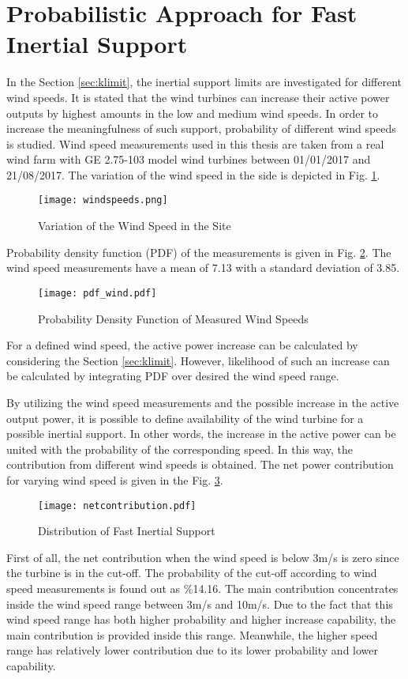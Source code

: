\section{Probabilistic Approach for Fast Inertial Support}
In the Section \ref{sec:klimit}, the inertial support limits are investigated for different wind speeds. It is stated that the wind turbines can increase their active power outputs by highest amounts in the low and medium wind speeds. In order to increase the meaningfulness of such support, probability of different wind speeds is studied. Wind speed measurements used in this thesis are taken from a real wind farm with GE 2.75-103 model wind turbines between 01/01/2017 and 21/08/2017. The variation of the wind speed in the side is depicted in Fig. \ref{windvariation}.\par
\begin{figure}[h!]
	\centering
	\texttt{[image: windspeeds.png]}
	\caption{Variation of the Wind Speed in the Site}
	\label{windvariation}
\end{figure}
Probability density function (PDF) of the measurements is given in Fig. \ref{windpdf}. The wind speed measurements have a mean of 7.13 with a standard deviation of 3.85.\par
\begin{figure}[h!]
	\centering
	\texttt{[image: pdf\_wind.pdf]}
	\caption{Probability Density Function of Measured Wind Speeds}
	\label{windpdf}
\end{figure}
For a defined wind speed, the active power increase can be calculated by considering the Section \ref{sec:klimit}. However, likelihood of such an increase can be calculated by integrating PDF over desired the wind speed range.\par
By utilizing the wind speed measurements and the possible increase in the active output power, it is possible to define availability of the wind turbine for a possible inertial support. In other words, the increase in the active power can be united with the probability of the corresponding speed. In this way, the contribution from different wind speeds is obtained. The net power contribution for varying wind speed is given in the Fig. \ref{net_contribution}.\par
\begin{figure}[h!]
	\centering
	\texttt{[image: netcontribution.pdf]}
	\caption{Distribution of Fast Inertial Support}
	\label{net_contribution}
\end{figure}
First of all, the net contribution when the wind speed is below 3m/s is zero since the turbine is in the cut-off. The probability of the cut-off according to wind speed measurements is found out as \%14.16. The main contribution concentrates inside the wind speed range between 3m/s and 10m/s. Due to the fact that this wind speed range has both higher probability and higher increase capability, the main contribution is provided inside this range. Meanwhile, the higher speed range has relatively lower contribution due to its lower probability and lower capability. \par

